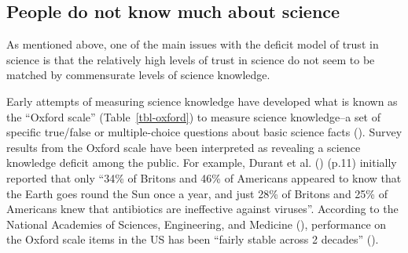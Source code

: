 \documentclass[
  jou,
  floatsintext,
  longtable,
  nolmodern,
  notxfonts,
  notimes,
  colorlinks=true,linkcolor=blue,citecolor=blue,urlcolor=blue]{apa7}
\begin{document}
\subsection{People do not know much about
science}\label{people-do-not-know-much-about-science}

As mentioned above, one of the main issues with the deficit model of
trust in science is that the relatively high levels of trust in science
do not seem to be matched by commensurate levels of science knowledge.

Early attempts of measuring science knowledge have developed what is
known as the ``Oxford scale'' (Table~\ref{tbl-oxford}) to measure
science knowledge--a set of specific true/false or multiple-choice
questions about basic science facts
(). Survey results
from the Oxford scale have been interpreted as revealing a science
knowledge deficit among the public. For example, Durant et al.
() (p.11)
initially reported that only ``34\% of Britons and 46\% of Americans
appeared to know that the Earth goes round the Sun once a year, and just
28\% of Britons and 25\% of Americans knew that antibiotics are
ineffective against viruses''. According to the National Academies of
Sciences, Engineering, and Medicine
(),
performance on the Oxford scale items in the US has been ``fairly stable
across 2 decades''
().
\end{document}
